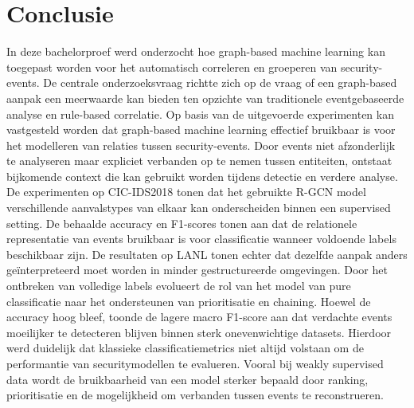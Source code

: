 
\chapter{Conclusie}%
\label{ch:conclusie}

In deze bachelorproef werd onderzocht hoe graph-based machine learning kan toegepast worden voor het automatisch correleren en groeperen van security-events. De centrale onderzoeksvraag richtte zich op de vraag of een graph-based aanpak een meerwaarde kan bieden ten opzichte van traditionele eventgebaseerde analyse en rule-based correlatie.
\newline
\newline
Op basis van de uitgevoerde experimenten kan vastgesteld worden dat graph-based machine learning effectief bruikbaar is voor het modelleren van relaties tussen security-events. Door events niet afzonderlijk te analyseren maar expliciet verbanden op te nemen tussen entiteiten, ontstaat bijkomende context die kan gebruikt worden tijdens detectie en verdere analyse.
\newline
\newline
De experimenten op CIC-IDS2018 tonen dat het gebruikte R-GCN model verschillende aanvalstypes van elkaar kan onderscheiden binnen een supervised setting. De behaalde accuracy en F1-scores tonen aan dat de relationele representatie van events bruikbaar is voor classificatie wanneer voldoende labels beschikbaar zijn.
\newline
\newline
De resultaten op LANL tonen echter dat dezelfde aanpak anders geïnterpreteerd moet worden in minder gestructureerde omgevingen. Door het ontbreken van volledige labels evolueert de rol van het model van pure classificatie naar het ondersteunen van prioritisatie en chaining. Hoewel de accuracy hoog bleef, toonde de lagere macro F1-score aan dat verdachte events moeilijker te detecteren blijven binnen sterk onevenwichtige datasets.
\newline
\newline
Hierdoor werd duidelijk dat klassieke classificatiemetrics niet altijd volstaan om de performantie van securitymodellen te evalueren. Vooral bij weakly supervised data wordt de bruikbaarheid van een model sterker bepaald door ranking, prioritisatie en de mogelijkheid om verbanden tussen events te reconstrueren.

